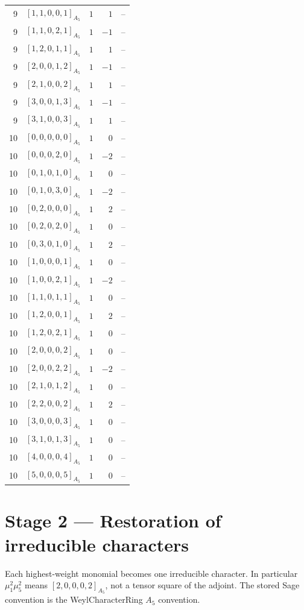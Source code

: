 \documentclass[11pt]{article}
\newcommand{\Dynkin}[1]{#1}
\begin{document}
\begin{longtable}{r l r r l}
9 & $\Dynkin{[1,1,0,0,1]_{A_5}}$ & $1$ & $1$ & --\\
9 & $\Dynkin{[1,1,0,2,1]_{A_5}}$ & $1$ & $-1$ & --\\
9 & $\Dynkin{[1,2,0,1,1]_{A_5}}$ & $1$ & $1$ & --\\
9 & $\Dynkin{[2,0,0,1,2]_{A_5}}$ & $1$ & $-1$ & --\\
9 & $\Dynkin{[2,1,0,0,2]_{A_5}}$ & $1$ & $1$ & --\\
9 & $\Dynkin{[3,0,0,1,3]_{A_5}}$ & $1$ & $-1$ & --\\
9 & $\Dynkin{[3,1,0,0,3]_{A_5}}$ & $1$ & $1$ & --\\
10 & $\Dynkin{[0,0,0,0,0]_{A_5}}$ & $1$ & $0$ & --\\
10 & $\Dynkin{[0,0,0,2,0]_{A_5}}$ & $1$ & $-2$ & --\\
10 & $\Dynkin{[0,1,0,1,0]_{A_5}}$ & $1$ & $0$ & --\\
10 & $\Dynkin{[0,1,0,3,0]_{A_5}}$ & $1$ & $-2$ & --\\
10 & $\Dynkin{[0,2,0,0,0]_{A_5}}$ & $1$ & $2$ & --\\
10 & $\Dynkin{[0,2,0,2,0]_{A_5}}$ & $1$ & $0$ & --\\
10 & $\Dynkin{[0,3,0,1,0]_{A_5}}$ & $1$ & $2$ & --\\
10 & $\Dynkin{[1,0,0,0,1]_{A_5}}$ & $1$ & $0$ & --\\
10 & $\Dynkin{[1,0,0,2,1]_{A_5}}$ & $1$ & $-2$ & --\\
10 & $\Dynkin{[1,1,0,1,1]_{A_5}}$ & $1$ & $0$ & --\\
10 & $\Dynkin{[1,2,0,0,1]_{A_5}}$ & $1$ & $2$ & --\\
10 & $\Dynkin{[1,2,0,2,1]_{A_5}}$ & $1$ & $0$ & --\\
10 & $\Dynkin{[2,0,0,0,2]_{A_5}}$ & $1$ & $0$ & --\\
10 & $\Dynkin{[2,0,0,2,2]_{A_5}}$ & $1$ & $-2$ & --\\
10 & $\Dynkin{[2,1,0,1,2]_{A_5}}$ & $1$ & $0$ & --\\
10 & $\Dynkin{[2,2,0,0,2]_{A_5}}$ & $1$ & $2$ & --\\
10 & $\Dynkin{[3,0,0,0,3]_{A_5}}$ & $1$ & $0$ & --\\
10 & $\Dynkin{[3,1,0,1,3]_{A_5}}$ & $1$ & $0$ & --\\
10 & $\Dynkin{[4,0,0,0,4]_{A_5}}$ & $1$ & $0$ & --\\
10 & $\Dynkin{[5,0,0,0,5]_{A_5}}$ & $1$ & $0$ & --\\
\bottomrule\end{longtable}
\section{Stage 2 --- Restoration of irreducible characters}
Each highest-weight monomial becomes one irreducible character. In particular $\mu_1^2\mu_5^2$ means $[2,0,0,0,2]_{A_5}$, not a tensor square of the adjoint. The stored Sage convention is the WeylCharacterRing $A_5$ convention.
\end{document}
